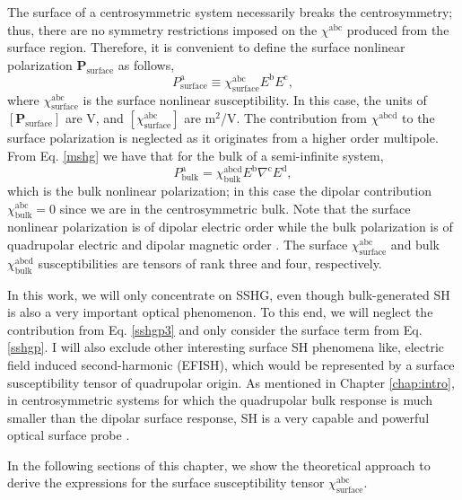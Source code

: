 The surface of a centrosymmetric system necessarily breaks the centrosymmetry;
thus, there are no symmetry restrictions imposed on the $\chi^{\mathrm{abc}}$
produced from the surface region. Therefore, it is convenient to define the
surface nonlinear polarization $\mathbf{P}_{\mathrm{surface}}$ as follows,
\begin{equation}\label{sshgp}
P^{\mathrm{a}}_{\mathrm{surface}}
\equiv \chi^{\mathrm{abc}}_{\mathrm{surface}}E^{\mathrm{b}}E^{\mathrm{c}},
\end{equation}
where $\chi^{\mathrm{abc}}_{\mathrm{surface}}$ is the surface nonlinear
susceptibility. In this case, the units of $[\mathbf{P}_{\mathrm{surface}}]$ are
V, and $[\chi^{\mathrm{abc}}_{\mathrm{surface}}]$ are m$^{2}$/V. The
contribution from $\chi^{\mathrm{abcd}}$ to the surface polarization is
neglected as it originates from a higher order multipole. From Eq. \eqref{mshg}
we have that for the bulk of a semi-infinite system,
\begin{equation}\label{sshgp3}
P^{\mathrm{a}}_{\mathrm{bulk}}
= \chi^{\mathrm{abcd}}_{\mathrm{bulk}}
  E^{\mathrm{b}}\nabla^{\mathrm{c}}E^{\mathrm{d}},  
\end{equation}
which is the bulk nonlinear polarization; in this case the dipolar contribution
$\chi^{\mathrm{abc}}_{\mathrm{bulk}} = 0$ since we are in the centrosymmetric
bulk. Note that the surface nonlinear polarization is of dipolar electric order
while the bulk polarization is of quadrupolar electric and dipolar magnetic
order \cite{bloembergenPR62}. The surface
$\chi^{\mathrm{abc}}_{\mathrm{surface}}$ and bulk
$\chi^{\mathrm{abcd}}_{\mathrm{bulk}}$ susceptibilities are tensors of rank
three and four, respectively.

In this work, we will only concentrate on SSHG, even though bulk-generated SH is
also a very important optical phenomenon. To this end, we will neglect the
contribution from Eq. \eqref{sshgp3} and only consider the surface term from Eq.
\eqref{sshgp}. I will also exclude other interesting surface SH phenomena like,
electric field induced second-harmonic (EFISH), which would be represented by a
surface susceptibility tensor of quadrupolar origin. As mentioned in Chapter
\ref{chap:intro}, in centrosymmetric systems for which the quadrupolar bulk
response is much smaller than the dipolar surface response, SH is a very capable
and powerful optical surface probe \cite{downerSIA01}.

In the following sections of this chapter, we show the theoretical
approach to derive the expressions for the surface susceptibility tensor
$\chi^{\mathrm{abc}}_{\mathrm{surface}}$.

